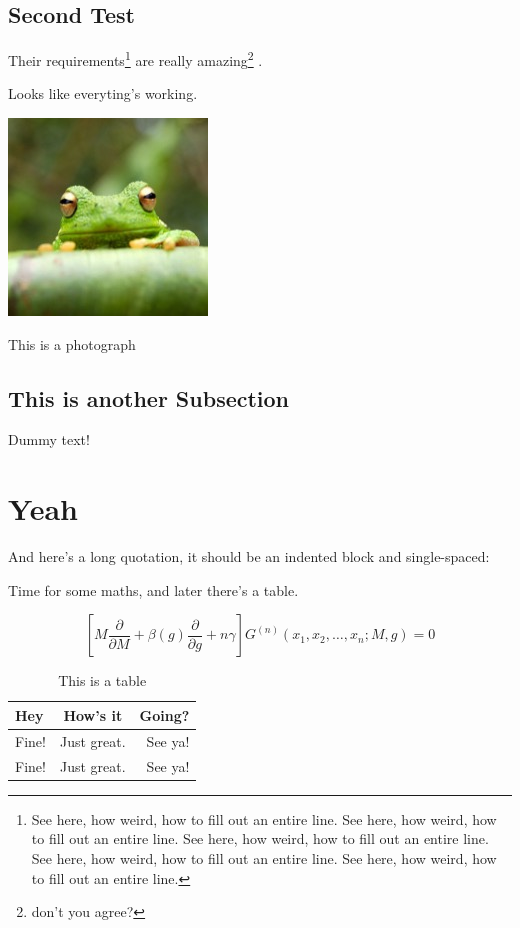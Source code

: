 \subsection{Second Test}
Their \cite{audibert:2004} requirements\footnote{See here, how weird, how to fill out an entire line. See here, how weird, how to fill out an entire line. See here, how weird, how to fill out an entire line. See here, how weird, how to fill out an entire line. See here, how weird, how to fill out an entire line. } are really amazing\footnote{don't you agree?} \cite[34]{budanitsky:hirst:2006}.

Looks like everyting's working. 

\begin{photo}[hbt!]
\centering
\includegraphics[width=.5\linewidth]{frog}
\caption{This is a photograph}
\end{photo}

\subsection{This is another Subsection}

Dummy text! \lipsum[1]

\section{Yeah}

And here's a long quotation, it should be an indented block and single-spaced:

\begin{quote}
\lipsum[5-6]
\end{quote}

Time for some maths, and later there's a table.

\begin{equation}
\left[M\frac{\partial }{\partial M}+\beta(g)\frac{\partial }{\partial g}+n\gamma\right] G^{(n)}(x_1,x_2,\ldots,x_n;M,g)=0
\end{equation}

\begin{table}[hbt!]
\caption{This is a table}
\centering
\begin{tabular}{ l c r }
\hline
Hey & How's it & Going?\\ \hline
Fine! & Just great. & See ya!\\
Fine! & Just great. & See ya!\\
\hline
\end{tabular}

\end{table}

\lipsum[7]